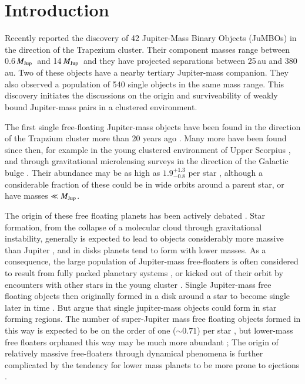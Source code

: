 \documentclass[submission,phys]{lib/SciPost}
\newcommand{\MJup}{\mbox{${M}_{\rm Jup}$}}
\newcommand{\jumbos}{\mbox{JuMBOs}}
\begin{document}
\section{Introduction}

Recently \cite{2023arXiv231001231P} reported the discovery of 42
Jupiter-Mass Binary Objects (\jumbos) in the direction of the
Trapezium cluster.  Their component masses range between 0.6\,\MJup\,
and 14\,\MJup\, and they have projected separations between 25\,au and
380\,au.  Two of these objects have a nearby tertiary Jupiter-mass
companion.  They also observed a population of 540 single objects in
the same mass range. This discovery initiates the discussions on the
origin and surviveability of weakly bound Jupiter-mass pairs in a
clustered environment.

The first single free-floating Jupiter-mass objects have been found in
the direction of the Trapzium cluster more than 20 years ago
\cite{2000Sci...290..103Z,2000MNRAS.314..858L,2000AGM....17..A11M}.
Many more have been found since then, for example in the young
clustered environment of Upper Scorpius \cite{2022NatAs...6...89M},
and through gravitational microlensing surveys in the direction of the
Galactic bulge \cite{2011Natur.473..349S}.  Their abundance may be as
high as $1.9^{+1.3}_{-0.8}$ per star \cite{2011Natur.473..349S},
although a considerable fraction of these could be in wide orbits
around a parent star, or have masses $\ll \MJup$.


The origin of these free floating planets has been actively debated
\cite{2023Ap&SS.368...17M}. Star formation, from the collapse of a
molecular cloud through gravitational instability, generally is
expected to lead to objects considerably more massive than Jupiter
\cite{1976MNRAS.176..367L,2005A&A...430.1059B}, and in disks planets
tend to form with lower masses. As a consequence, the large population
of Jupiter-mass free-floaters is often considered to result from fully
packed planetary systems \cite{2023arXiv231015603C}, or kicked out of
their orbit by encounters with other stars in the young cluster
\cite{2019A&A...624A.120V}. Single Jupiter-mass free floating objects
then originally formed in a disk around a star to become single later
in time
\cite{1996Sci...274..954R,2015MNRAS.453.2759Z,2002ApJ...565.1251H,2017MNRAS.470.4337C,
  2019MNRAS.489.2280F,2019A&A...624A.120V}.  But
\cite{2006A&A...458..817W} argue that single jupiter-mass objects
could form in star forming regions.  The number of super-Jupiter mass
free floating objects formed in this way is expected to be on the
order of one ($\sim 0.71$) per star \cite{2019A&A...624A.120V}, but
lower-mass free floaters orphaned this way may be much more abundant
\cite{2002ApJ...565.1251H}; The origin of relatively massive
free-floaters through dynamical phenomena is further complicated by
the tendency for lower mass planets to be more prone to ejections
\cite{2001Icar..150..303F,2013MNRAS.433..867H,2019MNRAS.489.2280F,2020MNRAS.497.1807S}.
\end{document}

